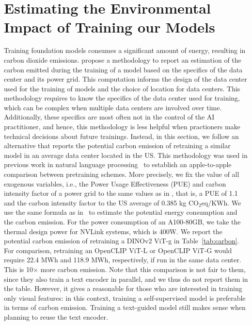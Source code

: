 \section{Estimating the Environmental Impact of Training our Models} 

Training foundation models consumes a significant amount of energy, resulting in carbon dioxide emissions.
\citet{patterson2021carbon} propose a methodology to report an estimation of the carbon emitted during the training of a model based on the specifics of the data center and its power grid. This computation informs the design of the data center used for the training of models and the choice of location for data centers. This methodology requires to know the specifics of the data center used for training, which can be complex when multiple data centers are involved over time. Additionally, these specifics are most often not in the control of the AI practitioner, and hence, this methodology is less helpful when practioners make technical decisions about future trainings. Instead, in this section, we follow an alternative that reports the potential carbon emission of retraining a similar model in an average data center located in the US. This methodology was used in previous work in natural language processing~\citep{strubell2019energy,touvron2023llama} to establish an apple-to-apple comparison between pretraining schemes. More precisely, we fix the value of all exogenous variables, i.e., the Power Usage Effectiveness (PUE) and carbon intensity factor of a power grid to the same values as in \citet{touvron2023llama}, that is, a PUE of 1.1 and the carbon intensity factor to the US average of 0.385 kg CO$_2$eq/KWh. We use the same formula as in~\cite{patterson2021carbon} to estimate the potential energy consumption and the carbon emission. For the power consumption of an A100-80GB, we take the thermal design power for NVLink systems, which is 400W. We report the potential carbon emission of retraining a DINOv2 ViT-g in Table~\ref{tab:carbon}.
For comparison, retraining an OpenCLIP ViT-L or OpenCLIP ViT-G would require 22.4 MWh and 118.9 MWh, respectively, if run in the same data center. This is 10$\times$ more carbon emission. Note that this comparison is not fair to them, since they also train a text encoder in parallel, and we thus do not report them in the table. However, it gives a reasonable  for those who are interested in training only visual features: in this context, training a self-supervised model is preferable in terms of carbon emission. Training a text-guided model still makes sense when planning to reuse the text encoder.

